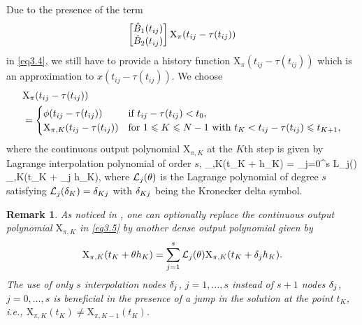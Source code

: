 \documentclass[final,reqno]{siamltex}
\newtheorem{remark}[theorem]{Remark}
\begin{document}
Due to the presence of the term
%
\[\begin{bmatrix} \hat{B}_1(t_{ij}) \\ \hat{B}_2(t_{ij}) \end{bmatrix} \mathrm{X}_{\pi}(t_{ij}-\tau(t_{ij}))
\]
%
 in \eqref{eq3.4}, we still have to provide a history function
$\mathrm{X}_{\pi}(t_{ij}-\tau(t_{ij}))$ which is an approximation to $x(t_{ij}-\tau(t_{ij}))$. We choose
%
\[
\begin{split} 
&  \mathrm{X}_{\pi}(t_{ij}-\tau(t_{ij})) \\
 & =
 \begin{cases}
  \phi(t_{ij}-\tau(t_{ij}))                & \mbox{if } t_{ij}-\tau(t_{ij}) < t_0, \\
  \mathrm{X}_{\pi,K}(t_{ij}-\tau(t_{ij}))  & \mbox{for $ 1 \leqslant K \leqslant N-1$ with } t_K < t_{ij}-\tau(t_{ij}) \leqslant t_{K+1},
 \end{cases}
 \end{split}
\]
%
where the continuous output polynomial $\mathrm{X}_{\pi,K}$ at the $K$th step is given by Lagrange interpolation polynomial of order $s$,
%
\be\label{eq3.5}
 _{\pi,K}(t_K + \tet h_K) = \sum_{j=0}^s {\cal L}_j(\tet) _{\pi,K}(t_K + \de_j h_K),
\ee
%
where ${\cal L}_j(\tet)$ is the Lagrange polynomial of degree $s$ satisfying ${\cal L}_j(\de_K) = \de_{Kj}$ with $\delta_{Kj}$ being the Kronecker delta symbol.

\begin{remark}{\rm
 As noticed in \cite{GugH01,GugH07}, one can optionally replace the continuous output polynomial $\mathrm{X}_{\pi,K}$ in \eqref{eq3.5} by another dense output polynomial given by
 \[
  \mathrm{X}_{\pi,K}(t_K + \tet h_K) = \sum_{j=1}^s {\cal L}_j(\tet) \mathrm{X}_{\pi,K}(t_K + \de_j h_K).
 \]
 The use of only $s$ interpolation nodes $\delta_j$, $j=1,\dots,s$ instead of $s+1$ nodes $\delta_j$, $j=0,\dots,s$ is beneficial in the presence of a jump in the solution at the
 point $t_K$, i.e., $\mathrm{X}_{\pi,K}(t_K) \not= \mathrm{X}_{\pi,K-1}(t_K)$.
 }
\end{remark}
\end{document}
